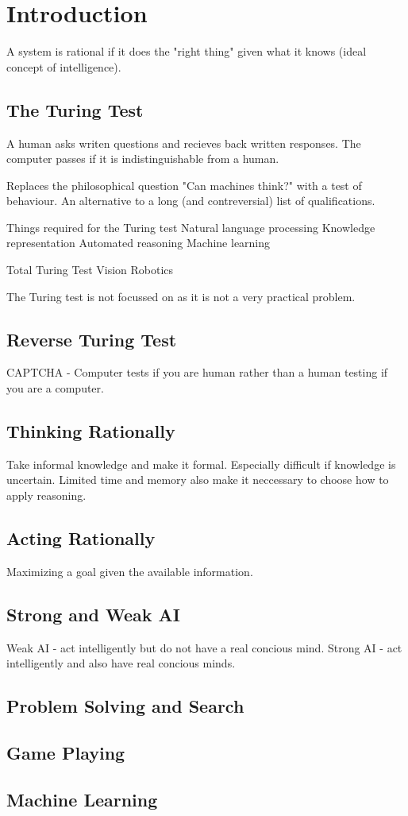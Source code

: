 \section{Introduction}
	A system is rational if it does the "right thing" given what it knows (ideal concept of intelligence).
	\subsection{The Turing Test}
	A human asks writen questions and recieves back written responses.
	The computer passes if it is indistinguishable from a human.
	
	Replaces the philosophical question "Can machines think?" with a test of behaviour.
	An alternative to a long (and contreversial) list of qualifications.

	Things required for the Turing test
	Natural language processing
	Knowledge representation
	Automated reasoning
	Machine learning
	
	Total Turing Test
	Vision
	Robotics
	
	The Turing test is not focussed on as it is not a very practical problem.
	
	\subsection{Reverse Turing Test}
	CAPTCHA - Computer tests if you are human rather than a human testing if you are a computer.

	\subsection{Thinking Rationally}
	Take informal knowledge and make it formal.
	Especially difficult if knowledge is uncertain.
	Limited time and memory also make it neccessary to choose how to apply reasoning.
	
	\subsection{Acting Rationally}
	Maximizing a goal given the available information.

	\subsection{Strong and Weak AI}
	Weak AI - act intelligently but do not have a real concious mind.
	Strong AI - act intelligently and also have real concious minds.

	\subsection{Problem Solving and Search}
	\subsection{Game Playing}
	\subsection{Machine Learning}

	

